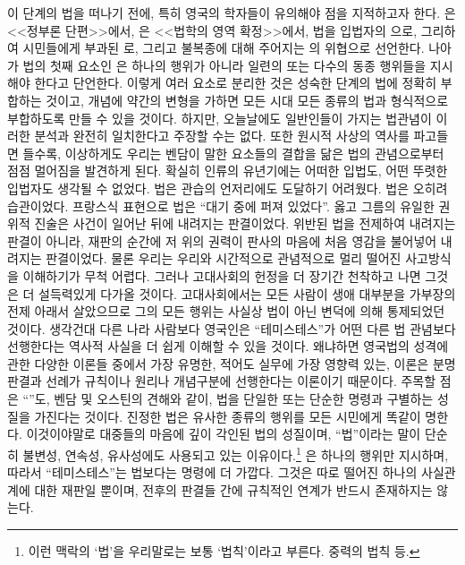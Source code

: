 이 단계의 법을 떠나기 전에,
특히 영국의 학자들이 유의해야 점을 지적하고자 한다.
은 <<정부론 단편>>에서,
은 <<법학의 영역 확정>>에서,
법을 입법자의 으로,
그리하여 시민들에게 부과된 로,
그리고 불복종에 대해 주어지는 의 위협으로 선언한다.
나아가 법의 첫째 요소인 은 하나의 행위가 아니라
일련의 또는 다수의 동종 행위들을 지시해야 한다고 단언한다.
이렇게 여러 요소로 분리한 것은 성숙한 단계의 법에 정확히 부합하는 것이고,
개념에 약간의 변형을 가하면 모든 시대 모든 종류의 법과
형식적으로 부합하도록 만들 수 있을 것이다.
하지만, 오늘날에도 일반인들이 가지는 법관념이
이러한 분석과 완전히 일치한다고 주장할 수는 없다.
또한 원시적 사상의 역사를 파고들면 들수록, 이상하게도 우리는
벤담이 말한 요소들의 결합을 닮은 법의 관념으로부터 점점 멀어짐을 발견하게 된다.
확실히 인류의 유년기에는 어떠한 입법도, 어떤 뚜렷한 입법자도 생각될 수 없었다.
법은 관습의 언저리에도 도달하기 어려웠다.
법은 오히려 습관이었다.
프랑스식 표현으로 법은 ``대기 중에 퍼져 있었다''.
옳고 그름의 유일한 권위적 진술은 사건이 일어난 뒤에 내려지는 판결이었다.
위반된 법을 전제하여 내려지는 판결이 아니라,
재판의 순간에 저 위의 권력이 판사의 마음에
처음 영감을 불어넣어 내려지는 판결이었다.
물론 우리는 우리와 시간적으로 관념적으로 멀리 떨어진 사고방식을
이해하기가 무척 어렵다.
그러나 고대사회의 헌정을 더 장기간 천착하고 나면 그것은 더 설득력있게
다가올 것이다.
고대사회에서는 모든 사람이
생애 대부분을 가부장의 전제 아래서 살았으므로
그의 모든 행위는 사실상 법이 아닌 변덕에 의해 통제되었던 것이다.
생각건대 다른 나라 사람보다 영국인은
``테미스테스''가
어떤 다른 법 관념보다
선행한다는 역사적 사실을 더 쉽게 이해할 수 있을 것이다.
왜냐하면 영국법의 성격에 관한 다양한 이론들 중에서
가장 유명한, 적어도 실무에 가장 영향력 있는, 이론은 분명
판결과 선례가 규칙이나 원리나 개념구분에 선행한다는 이론이기 때문이다.
주목할 점은 ``''도,
벤담 및 오스틴의 견해와 같이,
법을 단일한 또는 단순한 명령과 구별하는 성질을 가진다는 것이다.
진정한 법은 유사한 종류의 행위를 모든 시민에게 똑같이 명한다.
이것이야말로 대중들의 마음에 깊이 각인된 법의 성질이며,
``법''이라는 말이 단순히 불변성, 연속성, 유사성에도 사용되고 있는
이유이다.\footnote{이런 맥락의 `법'을 우리말로는 보통 `법칙'이라고 부른다.
  중력의 법칙 등.}
은 하나의 행위만 지시하며,
따라서 ``테미스테스''는 법보다는 명령에 더 가깝다.
그것은 따로 떨어진 하나의 사실관계에 대한 재판일 뿐이며,
전후의 판결들 간에 규칙적인 연계가 반드시 존재하지는 않는다.

